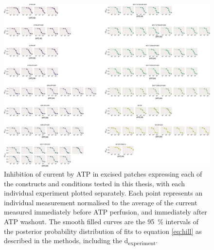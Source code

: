 \begin{figure}[h]
	\centering
	\includegraphics[width=\textwidth]{all_atp_fits_2.pdf}
	\caption[ATP inhibition sample hill fits]{
	Inhibition of current by ATP in excised patches expressing each of the constructs and conditions tested in this thesis, with each individual experiment plotted separately.
	Each point represents an individual measurement normalised to the average of the current measured immediately before ATP perfusion, and immediately after ATP washout.
	The smooth filled curves are the \SI{95}{\percent} intervals of the posterior probability distribution of fits to equation \ref{eq:hill} as described in the methods, including the \textgreek{d}\textsubscript{experiment}.
	}
	\label{apxfig:atp_inhib_2}
\end{figure}

